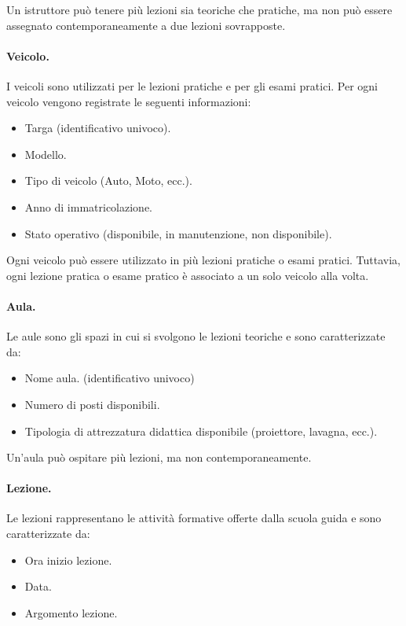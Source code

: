 \documentclass[10pt,twoside]{article}
\begin{document}
{    Un istruttore può tenere più lezioni sia teoriche che pratiche, ma non può essere assegnato contemporaneamente a due lezioni sovrapposte.
    

    \paragraph{Veicolo.}
    I veicoli sono utilizzati per le lezioni pratiche e per gli esami pratici. Per ogni veicolo vengono registrate le seguenti informazioni:
    
    \begin{itemize}
        \item Targa (identificativo univoco).
        \item Modello.
        \item Tipo di veicolo (Auto, Moto, ecc.).
        \item Anno di immatricolazione.
        \item Stato operativo (disponibile, in manutenzione, non disponibile).
    \end{itemize}

    Ogni veicolo può essere utilizzato in più lezioni pratiche o esami pratici. Tuttavia, ogni lezione pratica o esame pratico è associato a un solo veicolo alla volta.
    

    \paragraph{Aula.}
    Le aule sono gli spazi in cui si svolgono le lezioni teoriche e sono caratterizzate da:

    \begin{itemize}
        \item Nome aula. (identificativo univoco)
        \item Numero di posti disponibili.
        \item Tipologia di attrezzatura didattica disponibile (proiettore, lavagna, ecc.).
    \end{itemize}

    Un’aula può ospitare più lezioni, ma non contemporaneamente.
    

    \paragraph{Lezione.}
    Le lezioni rappresentano le attività formative offerte dalla scuola guida e sono caratterizzate da: 
    
    \begin{itemize}
        \item Ora inizio lezione.
        \item Data.
        \item Argomento lezione.
    \end{itemize}
    
}
\end{document}
